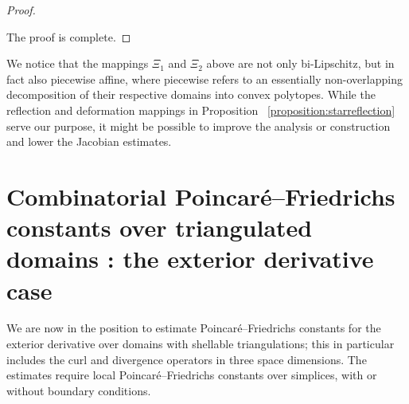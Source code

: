 \documentclass[10pt,letterpaper]{article}
\newcommand\cye[1]{%
  \protect\leavevmode
  \begingroup
    \color{red!35!yellow}%
    #1%
  \endgroup
}
\begin{document}
\begin{proof}
\begin{itemize}

    \end{itemize}
    The proof is complete. 
\end{proof}

\begin{remark}
    We notice that the mappings $\Xi_{1}$ and $\Xi_{2}$ above are not only bi-Lipschitz, but in fact also piecewise affine, 
    where piecewise refers to an essentially non-overlapping decomposition of their respective domains into convex polytopes.
    While the reflection and deformation mappings in \cye{Proposition}~\ref{proposition:starreflection} serve our purpose,
    it might be possible to improve the analysis or construction and lower the Jacobian estimates. 
\end{remark}


\section{\cye{Combinatorial} Poincar\'e--Friedrichs \cye{constants over} triangulated domains\cye{: the exterior derivative case}}\label{section:poincarefriedrichs}

We are now in the position to estimate Poincar\'e--Friedrichs constants for the exterior derivative over domains with shellable triangulations; this \cye{in particular} includes the curl and divergence operators in three \cye{space} dimensions. 
The estimates require local Poincar\'e--Friedrichs constants over simplices, 
with or without boundary conditions. 
\end{document}
